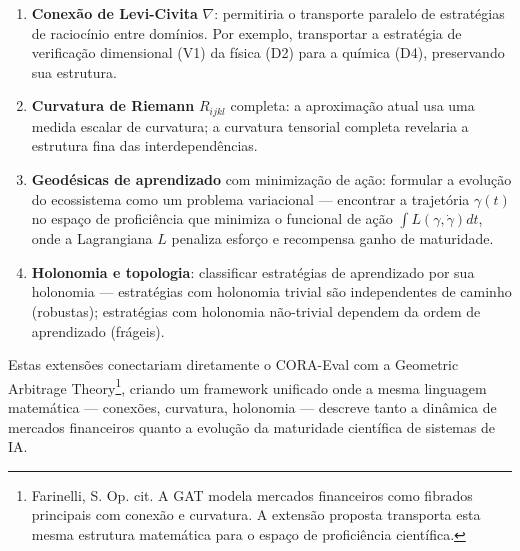 \begin{enumerate}[label=(\roman*)]
\item \textbf{Conexão de Levi-Civita} $\nabla$: permitiria o transporte
      paralelo de estratégias de raciocínio entre domínios. Por exemplo,
      transportar a estratégia de verificação dimensional (V1) da física (D2)
      para a química (D4), preservando sua estrutura.
\item \textbf{Curvatura de Riemann} $R_{ijkl}$ completa: a aproximação atual
      usa uma medida escalar de curvatura; a curvatura tensorial completa
      revelaria a estrutura fina das interdependências.
\item \textbf{Geodésicas de aprendizado} com minimização de ação: formular a
      evolução do ecossistema como um problema variacional — encontrar a
      trajetória $\gamma(t)$ no espaço de proficiência que minimiza o
      funcional de ação $\int L(\gamma, \dot{\gamma}) dt$, onde a Lagrangiana
      $L$ penaliza esforço e recompensa ganho de maturidade.
\item \textbf{Holonomia e topologia}: classificar estratégias de aprendizado
      por sua holonomia — estratégias com holonomia trivial são
      independentes de caminho (robustas); estratégias com holonomia
      não-trivial dependem da ordem de aprendizado (frágeis).
\end{enumerate}

Estas extensões conectariam diretamente o CORA-Eval com a Geometric Arbitrage
Theory\footnote{Farinelli, S. Op. cit. A GAT modela mercados financeiros como
fibrados principais com conexão e curvatura. A extensão proposta transporta
esta mesma estrutura matemática para o espaço de proficiência científica.},
criando um framework unificado onde a mesma linguagem matemática — conexões,
curvatura, holonomia — descreve tanto a dinâmica de mercados financeiros
quanto a evolução da maturidade científica de sistemas de IA.
